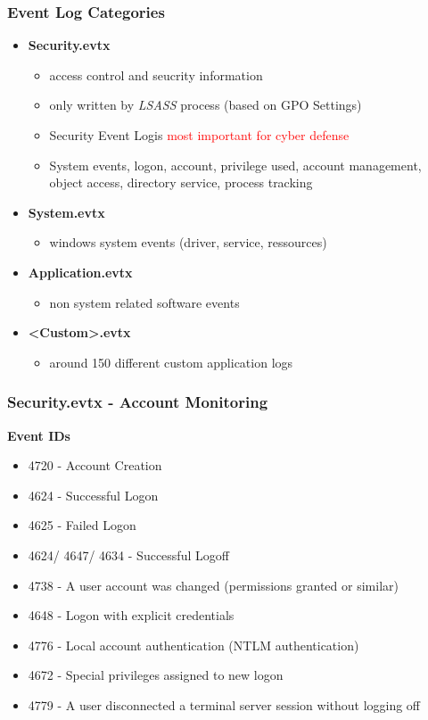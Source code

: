 \subsubsection{Event Log Categories}
\begin{itemize}
    \item \textbf{Security.evtx}
    \begin{itemize}
        \item access control and seucrity information
        \item only written by \textit{LSASS} process (based on GPO Settings)
        \item \glqq Security Event Log\grqq is \textcolor{red}{most important for cyber defense}
        \item System events, logon, account, privilege used, account management, object access, directory service, process tracking
    \end{itemize}
    \item \textbf{System.evtx}
    \begin{itemize}
        \item windows system events (driver, service, ressources)
    \end{itemize}
    \item \textbf{Application.evtx}
    \begin{itemize}
        \item non system related software events
    \end{itemize}
    \item \textbf{<Custom>.evtx}
    \begin{itemize}
        \item around 150 different custom application logs
    \end{itemize}
\end{itemize}

\subsubsection{Security.evtx - Account Monitoring}
\textbf{Event IDs}
\begin{itemize}
    \item 4720 - Account Creation
    \item 4624 - Successful Logon
    \item 4625 - Failed Logon
    \item 4624/ 4647/ 4634 - Successful Logoff
    \item 4738 - A user account was changed (permissions granted or similar)
    \item 4648 - Logon with explicit credentials
    \item 4776 - Local account authentication (NTLM authentication)
    \item 4672 - Special privileges assigned to new logon
    \item 4779 - A user disconnected a terminal server session without logging off
\end{itemize}

